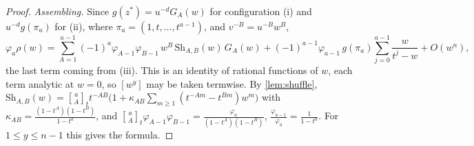 \documentclass[11pt]{amsart}
\theoremstyle{definition}
\theoremstyle{remark}
\numberwithin{equation}{section}
\newcommand{\qbin}[2]{\genfrac{[}{]}{0pt}{}{#1}{#2}_t}
\begin{document}
\begin{proof}
\emph{Assembling.} Since $g(z^*)=u^{-d}G_A(w)$ for configuration (i) and $u^{-d}g(\pi_a)$ for (ii), where $\pi_a=(1,t,\dots,t^{a-1})$, and $v^{-B}=u^{-B}w^B$,
\[ \varphi_a\rho(w)=\sum_{A=1}^{a-1}(-1)^a\varphi_{A-1}\varphi_{B-1}\,w^B\,\mathrm{Sh}_{A,B}(w)\,G_A(w)+(-1)^{a-1}\varphi_{a-1}\,g(\pi_a)\sum_{j=0}^{a-1}\frac{w}{t^j-w}+O(w^n), \]
the last term coming from (iii). This is an identity of rational functions of $w$, each term analytic at $w=0$, so $[w^y]$ may be taken termwise. By \cref{lem:shuffle}, $\mathrm{Sh}_{A,B}(w)=\qbin aA t^{-AB}\bigl(1+\kappa_{AB}\sum_{m\ge1}(t^{-Am}-t^{Bm})w^m\bigr)$ with $\kappa_{AB}=\frac{(1-t^A)(1-t^B)}{1-t^a}$, and $\qbin aA\varphi_{A-1}\varphi_{B-1}=\frac{\varphi_a}{(1-t^A)(1-t^B)}$, $\frac{\varphi_{a-1}}{\varphi_a}=\frac1{1-t^a}$. For $1\le y\le n-1$ this gives the formula.
\end{proof}
\end{document}
